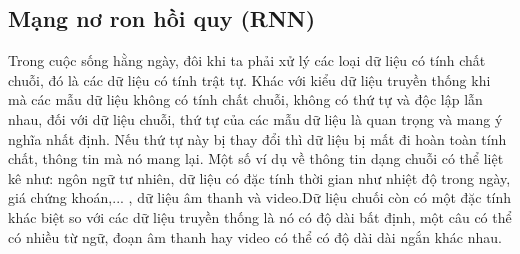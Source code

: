 
\subsection{Mạng nơ ron hồi quy (RNN)}

Trong cuộc sống hằng ngày, đôi khi ta phải xử lý các loại dữ liệu có tính chất chuỗi, đó là các dữ liệu có tính trật tự. Khác với kiểu dữ liệu truyền thống khi mà các mẫu dữ liệu không có tính chất chuỗi, không có thứ tự và độc lập lẫn nhau, đối với dữ liệu chuỗi, thứ tự của các mẫu dữ liệu là quan trọng và mang ý nghĩa nhất định. Nếu thứ tự này bị thay đổi thì dữ liệu bị mất đi hoàn toàn tính chất, thông tin mà nó mang lại. Một số ví dụ về thông tin dạng chuỗi có thể liệt kê như: ngôn ngữ tư nhiên, dữ liệu có đặc tính thời gian như nhiệt độ trong ngày, giá chứng khoán,... , dữ liệu âm thanh và video.Dữ liệu chuối còn có một đặc tính khác biệt so với các dữ liệu truyền thống là nó có độ dài bất định, một câu có thể có nhiều từ ngữ, đoạn âm thanh hay video có thể có độ dài dài ngắn khác nhau. 

